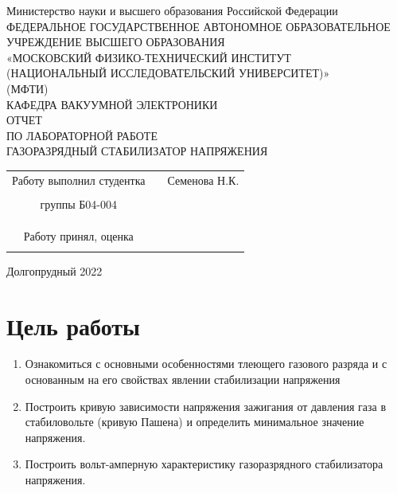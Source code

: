 \documentclass[a4paper]{article}
\begin{document}
 
 \begin{titlepage}
\begin{center}
\hfill \break
Министерство науки и высшего образования Российской Федерации\\
ФЕДЕРАЛЬНОЕ ГОСУДАРСТВЕННОЕ АВТОНОМНОЕ ОБРАЗОВАТЕЛЬНОЕ\\ 
УЧРЕЖДЕНИЕ ВЫСШЕГО ОБРАЗОВАНИЯ\\ 
«МОСКОВСКИЙ ФИЗИКО-ТЕХНИЧЕСКИЙ ИНСТИТУТ\\ 
(НАЦИОНАЛЬНЫЙ ИССЛЕДОВАТЕЛЬСКИЙ УНИВЕРСИТЕТ)»\\
(МФТИ)\\
\hfill \break
\hfill \break
\hfill \break
\hfill \break
\hfill \break
\hfill \break
\hfill \break
\hfill \break
\hfill \break
\hfill \break
\hfill \break
КАФЕДРА ВАКУУМНОЙ ЭЛЕКТРОНИКИ\\
\hfill \break
ОТЧЕТ\\
ПО ЛАБОРАТОРНОЙ РАБОТЕ\\
\hfill \break
ГАЗОРАЗРЯДНЫЙ СТАБИЛИЗАТОР НАПРЯЖЕНИЯ\\
\end{center}
\hfill \break
\hfill \break
\hfill \break
\hfill \break
\hfill \break
\hfill \break
\hfill \break
\hfill \break
\begin{tabular}{ccc}
Работу выполнил студентка  & \underline{\hspace{5cm}}& Семенова Н.К. \\\\
группы Б04-004& &   \\\\
 & &  \\\\
Работу принял, оценка & \underline{\hspace{5cm}} &  \\\\
\end{tabular}
\hfill \break
\hfill \break
\begin{center} Долгопрудный 2022 
\end{center}
\end{titlepage}

\section{Цель работы}
\begin{enumerate}
    \item Ознакомиться с основными особенностями тлеющего газового разряда и с основанным на его свойствах явлении стабилизации напряжения
\item Построить кривую зависимости напряжения зажигания от давления газа в стабиловольте (кривую Пашена) и определить минимальное значение напряжения.
\item Построить вольт-амперную характеристику газоразрядного стабилизатора напряжения.

\end{enumerate}
\end{document}
